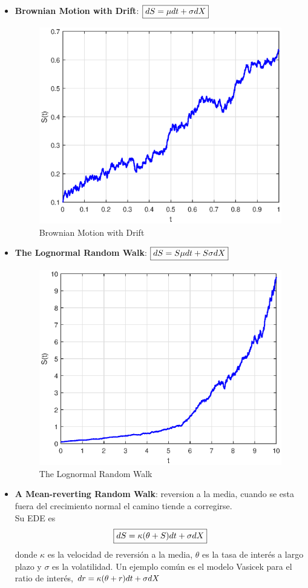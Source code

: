 \begin{itemize}
    \item \textbf{Brownian Motion with Drift}: $\boxed{dS = \mu dt + \sigma d\mathnormal{X}}$
    \begin{figure}[H]
        \centering
        \includegraphics[width=0.65\linewidth]{Imagenes/3_Aleatoriedad/BrownianMotionDrift.eps}
        \caption{Brownian Motion with Drift}
    \end{figure}
    \item \textbf{The Lognormal Random Walk}: $\boxed{dS = S\mu dt + S\sigma d\mathnormal{X}}$
    \begin{figure}[H]
        \centering
        \includegraphics[width=0.65\linewidth]{Imagenes/3_Aleatoriedad/LognormalRandomWalk.eps}
        \caption{The Lognormal Random Walk}
    \end{figure}
    \item \textbf{A Mean-reverting Random Walk}: reversion a la media, cuando se esta fuera del crecimiento normal el camino tiende a corregirse.\\
    Su EDE es 
    \[
        \boxed{dS = \kappa(\theta+S) dt + \sigma d\mathnormal{X}}
    \]
    donde $\kappa$ es la velocidad de reversión a la media, $\theta$ es la tasa de interés a largo plazo y $\sigma$ es la volatilidad. Un ejemplo común es el modelo Vasicek para el ratio de interés, $dr = \kappa(\theta+r) dt + \sigma d\mathnormal{X}$

\end{itemize}
